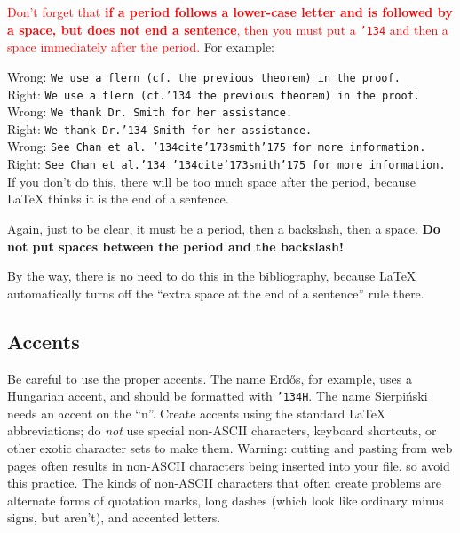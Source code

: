 \documentclass[12pt]{article}
\begin{document}
     \textcolor{red}{Don't forget that \textbf{if a period
follows a lower-case letter and is followed by a space, but does
not end a sentence}, then you must
put a {\tt \char'134} and then a space immediately 
after the period.}  For example:

\medskip

\noindent Wrong:
{\tt We use a flern (cf.\ the previous theorem) in the proof.} \\
\noindent Right:  
{\tt We use a flern (cf.\char'134\ the previous theorem) in the proof.} \\

\noindent Wrong:
{\tt We thank Dr.\ Smith for her assistance.} \\
\noindent Right:
{\tt We thank Dr.\char'134\ Smith for her assistance.}  \\

\noindent Wrong:
{\tt See Chan et al.\ \char'134cite\char'173smith\char'175\ for more information.}\\
\noindent Right:
{\tt See Chan et al.\char'134\ \char'134cite\char'173smith\char'175\ for more information.}\\

\noindent If you don't do this, there will be too much space
after the period, because LaTeX thinks it is the end of a sentence.

Again, just to be clear, it must be a period, then a backslash, then a space.
{\bf Do not put spaces between the period and the backslash!}

By the way,
there is no need to do this in the bibliography, because LaTeX automatically
turns off the ``extra space at the end of a sentence'' rule there.

\subsection{Accents}

    Be careful to use the proper accents.  The name
Erd\H{o}s, for example, uses a Hungarian accent, and
should be formatted with {\tt\char'134H}.  The name
Sierpi\'nski needs an accent on the ``n''.
Create accents using
the standard LaTeX abbreviations; do 
{\it not\/} use special non-ASCII characters, keyboard shortcuts,
or other exotic character sets to make them.  Warning: cutting and pasting
from web pages often results in non-ASCII 
characters being inserted into
your file, so avoid this practice.
The kinds of non-ASCII 
characters that often create problems
are alternate forms of quotation marks, long dashes (which look like ordinary
minus signs, but aren't), and accented letters.
\end{document}
